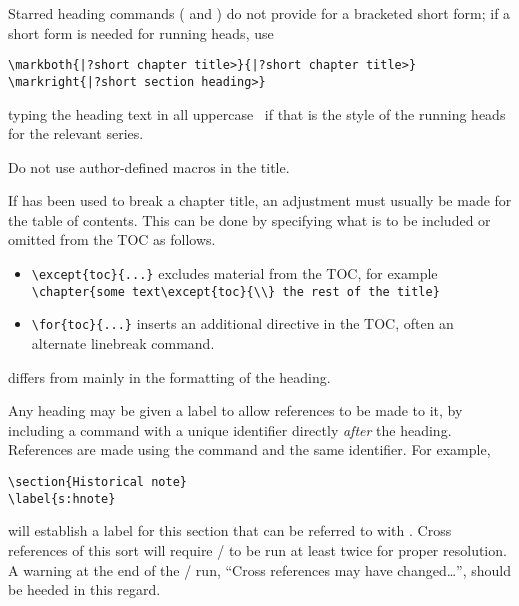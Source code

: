 \ifjournal
\else \ifproceedings
\else  %
 Starred heading commands ( and ) do
 not provide for a bracketed short form; if a short form is needed
 for running heads, use
\begin{verbatim}
\markboth{|?short chapter title>}{|?short chapter title>}
\markright{|?short section heading>}
\end{verbatim}%
 typing the heading text in all uppercase%
 \ifmonograph\ if that is the style of the running heads for the relevant
 series\fi.
\fi \fi

 Do not use author-defined macros in the title.

 If \cn{\\} has been used to break a chapter title, an adjustment must
 usually be made for the table of contents.  This can be done by
 specifying what is to be included or omitted from the TOC as follows.
\begin{itemize}
 \item \verb+\except{toc}{...}+ excludes material from the TOC, for
  example\\ \verb+\chapter{some text\except{toc}{\\} the rest of the title}+
 \item \verb+\for{toc}{...}+ inserts an additional directive in the
  TOC, often an alternate linebreak command.
\end{itemize}
\fi\fi

 differs from  mainly in the formatting
of the heading.  

Any heading may be given a label to allow references to be made to it,
by including a  command with a unique identifier
directly \emph{after} the heading.  References are made using the
command  and the same identifier.  For example,
\begin{verbatim}
\section{Historical note}
\label{s:hnote}
\end{verbatim}
will establish a label for this section that can be referred to with
. Cross references of
this sort will require \latex/ to be run at least twice for proper
resolution.  A warning at the end of the \latex/ run, ``Cross
references may have changed\dots\unskip'', should be heeded in this regard.


